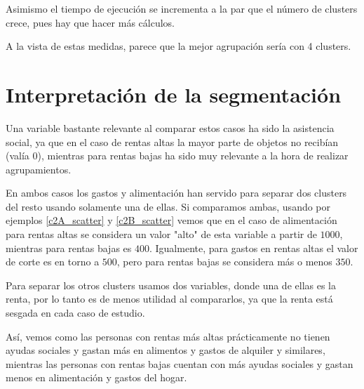 Asimismo el tiempo de ejecución se incrementa a la par que el número de clusters crece, pues hay que hacer más cálculos.

A la vista de estas medidas, parece que la mejor agrupación sería con 4 clusters.


\section{Interpretación de la segmentación}

Una variable bastante relevante al comparar estos casos ha sido la asistencia social, ya que en el caso de rentas altas la mayor parte de objetos no recibían (valía 0), mientras para rentas bajas ha sido muy relevante a la hora de realizar agrupamientos.

En ambos casos los gastos y alimentación han servido para separar dos clusters del resto usando solamente una de ellas. Si comparamos ambas, usando por ejemplos \eqref{c2A_scatter} y \eqref{c2B_scatter} vemos que en el caso de alimentación para rentas altas se considera un valor "alto" de esta variable a partir de $1000$, mientras para rentas bajas es $400$. Igualmente, para gastos en rentas altas el valor de corte es en torno a $500$, pero para rentas bajas se considera más o menos $350$.

Para separar los otros clusters usamos dos variables, donde una de ellas es la renta, por lo tanto es de menos utilidad al compararlos, ya que la renta está sesgada en cada caso de estudio.

Así, vemos como las personas con rentas más altas prácticamente no tienen ayudas sociales y gastan más en alimentos y gastos de alquiler y similares, mientras las personas con rentas bajas cuentan con más ayudas sociales y gastan menos en alimentación y gastos del hogar.




